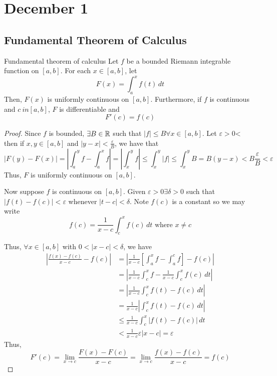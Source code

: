 \chapter{December 1}

\section{Fundamental Theorem of Calculus}
\begin{theorem}{Fundamental theorem of calculus}{}
    Let $f$ be a bounded Riemann integrable function on $[a, b]$. For each $x \in [a, b]$, let $$F(x) = \int_a^x f(t) \, dt$$ Then, $F(x)$ is uniformly continuous on $[a, b]$. Furthermore, if $f$ is continuous and $c \ in [a, b]$, $F$ is differentiable and $$F'(c) = f(c)$$
\end{theorem}
\begin{proof}
    Since $f$ is bounded, $\exists B \in \mathbb{R}$ such that $|f| \leq B \forall x \in [a, b]$. Let $\varepsilon > 0$< then if $x, y \in [a, b]$ and $|y - x| < \frac{\varepsilon}{B}$, we have that $$|F(y) - F(x)| = \left|\int_a^y f - \int_a^x f\right| = \left|\int_x^y f\right| \leq \int_x^y |f| \leq \int_x^y B = B(y - x) < B \frac{\varepsilon}{B}< \varepsilon$$ Thus, $F$ is uniformly continuous on $[a, b]$.

    Now suppose $f$ is continuous on $[a, b]$. Given $\varepsilon > 0 \exists \delta > 0$ such that $|f(t) - f(c)| < \varepsilon$ whenever $|t - c| < \delta$. Note $f(c)$ is a constant so we may write $$f(c) = \frac{1}{x - c} \int_c^x f(c) \, dt \text{ where } x \neq c$$
    
    Thus, $\forall x \in [a, b]$ with $0 < |x - c| < \delta$, we have
    \begin{align*}
        \left|\frac{f(x) - f(c)}{x - c} - f(c)\right| &= \left|\frac{1}{x - c} \left[\int_a^x f - \int_a^c f\right] - f(c) \right| \\
        &= \left|\frac{1}{x - c} \int_c^x f - \frac{1}{x - c} \int_c^x f(c) \, dt\right| \\
        &= \left|\frac{1}{x - c} \int_c^x f(t) - f(c) \, dt\right| \\
        &= \frac{1}{x - c} \left|\int_c^x f(t) - f(c) \, dt\right| \\
        &\leq \frac{1}{x - c} \int_c^x |f(t) - f(c)| \, dt \\
        &< \frac{1}{x - c} \varepsilon |x - c| = \varepsilon
    \end{align*}
    Thus, $$F'(c) = \lim_{x \to c} \frac{F(x) - F(c)}{x - c} = \lim_{x \to c} \frac{f(x) - f(c)}{x - c} = f(c)$$
\end{proof}

